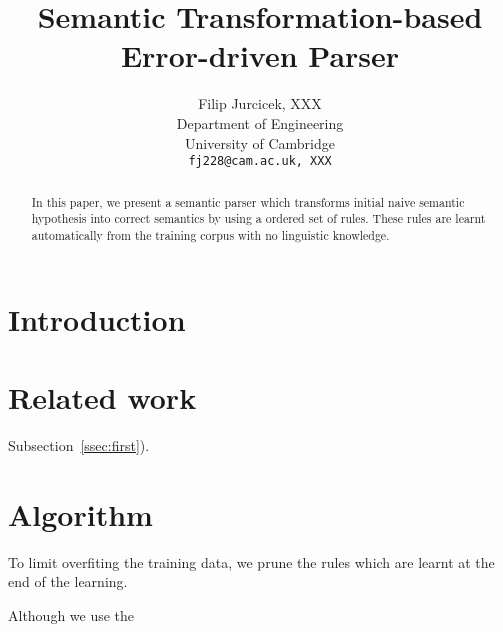 \documentclass[11pt]{article}
\title{Semantic Transformation-based Error-driven Parser}
\author{Filip Jurcicek, XXX \\
  Department of Engineering \\
  University of Cambridge \\
  {\tt fj228@cam.ac.uk, XXX}}
\date{}
\begin{document}
\maketitle
\begin{abstract}
  In this paper, we present a semantic parser which transforms initial naive semantic hypothesis into correct semantics by using a ordered set of rules. These rules are learnt automatically from the training corpus with no linguistic knowledge.
\end{abstract}

\section{Introduction}


\section{Related work}

Subsection~\ref{ssec:first}).

\section{Algorithm}

To limit overfiting the training data, we prune the rules which are learnt at the end of the learning. 

Although we use the 

% 
\end{document}
